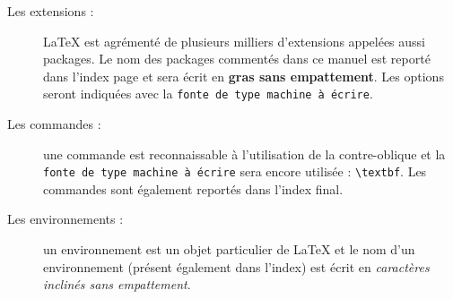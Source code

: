 \begin{description}
    \item[Les extensions :] \LaTeX{} est agrémenté de plusieurs milliers d'extensions appelées aussi packages. Le nom des packages commentés dans ce manuel est reporté dans l'index page \pageref{index-pack} et sera écrit en {\small\sffamily \textbf{gras sans empattement}}. Les options seront indiquées avec la \texttt{fonte de type machine à écrire}.

    \item[Les commandes :] une commande est reconnaissable à l'utilisation de la contre-oblique  et la \texttt{fonte de type machine à écrire} sera encore utilisée : \verb!\textbf!. Les commandes sont également reportés dans l'index final.

    \item[Les environnements :] un environnement est un objet particulier de \LaTeX{} et le nom d'un environnement (présent également dans l'index) est écrit en {\small\textit{\textsf{caractères inclinés sans empattement}}}.
\end{description}
